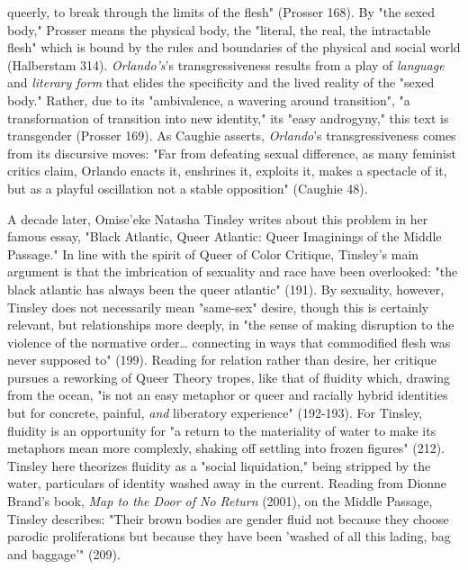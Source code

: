 \documentclass[11pt]{article}
\begin{document}
queerly, to break through the limits of the flesh" (Prosser 168). By
"the sexed body," Prosser means the physical body, the "literal, the
real, the intractable flesh" which is bound by the rules and
boundaries of the physical and social world (Halberstam
314). \emph{Orlando's}'s transgressiveness results from a play of
\emph{language} and \emph{literary form} that elides the specificity and the
lived reality of the "sexed body." Rather, due to its "ambivalence, a
wavering around transition", "a transformation of transition into new
identity," its "easy androgyny," this text is transgender (Prosser
169). As Caughie asserts, \emph{Orlando}'s transgressiveness comes from its
discursive moves: "Far from defeating sexual difference, as many
feminist critics claim, Orlando enacts it, enshrines it, exploits it,
makes a spectacle of it, but as a playful oscillation not a stable
opposition" (Caughie 48).

A decade later, Omise'eke Natasha Tinsley writes about this problem in
her famous essay, "Black Atlantic, Queer Atlantic: Queer Imaginings of
the Middle Passage." In line with the spirit of Queer of Color
Critique, Tinsley's main argument is that the imbrication of sexuality
and race have been overlooked: "the black atlantic has always been the
queer atlantic" (191). By sexuality, however, Tinsley does not
necessarily mean "same-sex" desire, though this is certainly relevant,
but relationships more deeply, in "the sense of making disruption to
the violence of the normative order\ldots{} connecting in ways that
commodified flesh was never supposed to" (199). Reading for relation
rather than desire, her critique pursues a reworking of Queer Theory
tropes, like that of fluidity which, drawing from the ocean, "is not
an easy metaphor or queer and racially hybrid identities but for
concrete, painful, \emph{and} liberatory experience" (192-193). For
Tinsley, fluidity is an opportunity for "a return to the materiality
of water to make its metaphors mean more complexly, shaking off
settling into frozen figures" (212). Tinsley here theorizes fluidity
as a "social liquidation," being stripped by the water, particulars of
identity washed away in the current. Reading from Dionne Brand's book,
\emph{Map to the Door of No Return} (2001), on the Middle Passage, Tinsley
describes: "Their brown bodies are gender fluid not because they
choose parodic proliferations but because they have been 'washed of
all this lading, bag and baggage'" (209).
\end{document}
